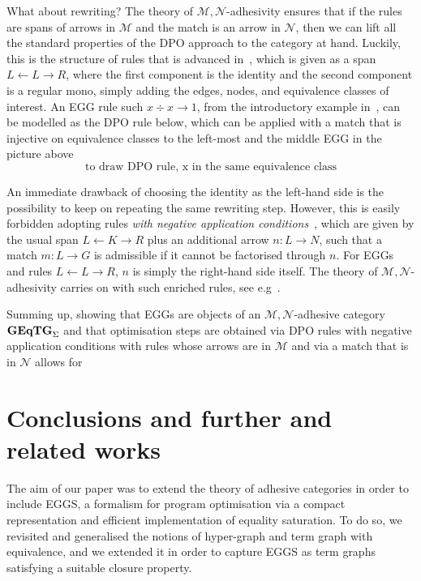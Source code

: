 \documentclass[a4paper,UKenglish,cleveref,pdftex,thm-restate,numberwithinsect]{lipics-v2021}
\newcommand{\catname}[1]{\textbf{\textup{#1}}}
\newcommand{\GEqTGs}{\catname{GEqTG}_{\Sigma}}
\begin{document}
What about rewriting? The theory of $\mathcal{M},\mathcal{N}$-adhesivity ensures that if the rules are spans of 
arrows in $\mathcal{M}$ and the match is an arrow in $\mathcal{N}$, then we can lift all the standard properties
of the DPO approach to the category at hand. Luckily, this is the structure of rules that is advanced in~\cite{DetlefsNS05},
which is given as a span $L \leftarrow L \rightarrow R$, where the first component is the identity and the second
component is a regular mono, simply adding the edges, nodes, and equivalence classes of interest.
%
An EGG rule such $x \div x \to 1$, from the introductory example in~\cite{WillseyNWFTP21}, 
can be modelled as the DPO rule below,
which can be applied with a match that is injective on equivalence classes to the left-most and the middle EGG
in the picture above
\[\mbox{to draw DPO rule, x in the same equivalence class} \]



An immediate drawback of choosing the identity as the left-hand side is the possibility to keep on repeating the same rewriting step.
However, this is easily forbidden adopting rules \emph{with negative application conditions}~\cite{xxx}, which are given by the usual span 
$L \leftarrow K \rightarrow R$ plus an additional arrow $n: L\rightarrow N$, such that a match $m: L \to G$ is admissible if it cannot
be factorised through $n$. For EGGs and rules $L \leftarrow L \rightarrow R$, $n$ is simply the right-hand side itself.
%
The theory of $\mathcal{M},\mathcal{N}$-adhesivity carries on with such enriched rules, see e.g~\cite{xxx}.

Summing up, showing that EGGs are objects of an $\mathcal{M},\mathcal{N}$-adhesive category $\GEqTGs$ and that optimisation 
steps are obtained via DPO rules with negative application conditions with rules whose arrows are in $\mathcal{M}$ and via a match 
that is in $\mathcal{N}$ allows for 


\section{Conclusions and further and related works}
\label{conclusioni}
The aim of our paper was to extend the theory of adhesive categories in order to include EGGS, 
a formalism for program optimisation via a compact representation and 
efficient implementation of equality saturation.
%
To do so, we revisited and generalised the notions of hyper-graph and term graph with equivalence, and
we extended it in order to capture EGGS as term graphs satisfying a suitable closure property.
\end{document}
